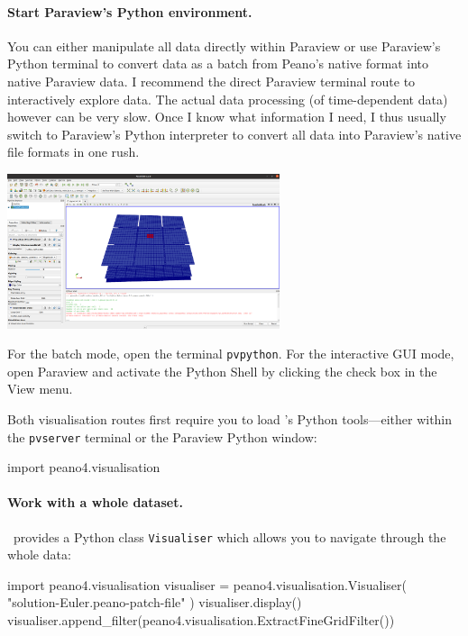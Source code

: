 \paragraph{Start Paraview's Python environment.}
%
%
You can either manipulate all data directly within Paraview or use Paraview's Python 
terminal to convert data as a batch from Peano's native format into native Paraview data.
I recommend the direct Paraview terminal route to interactively explore data.
The actual data processing (of time-dependent data) however can be very slow.
Once I know what information I need, I thus usually switch to Paraview's Python interpreter 
to convert all data into Paraview's native file formats in one rush.


\begin{center}
 \includegraphics[width=0.6\textwidth]{80_postprocessing/paraview.png}
\end{center}


For the batch mode, open the terminal \texttt{pvpython}.
For the interactive GUI mode, open Paraview and activate the Python Shell by clicking the check box in
the View menu.


Both visualisation routes first require you to load \Peano's Python tools---either
within the \texttt{pvserver} terminal or the Paraview Python window:
\begin{code}
import peano4.visualisation  
\end{code}


\paragraph{Work with a whole dataset.}
%
%
%
\Peano\ provides a Python class \texttt{Visualiser} which allows you to navigate through the whole data:
\begin{code}
import peano4.visualisation
visualiser = peano4.visualisation.Visualiser( "solution-Euler.peano-patch-file" )
visualiser.display()
visualiser.append_filter(peano4.visualisation.ExtractFineGridFilter())
\end{code}

